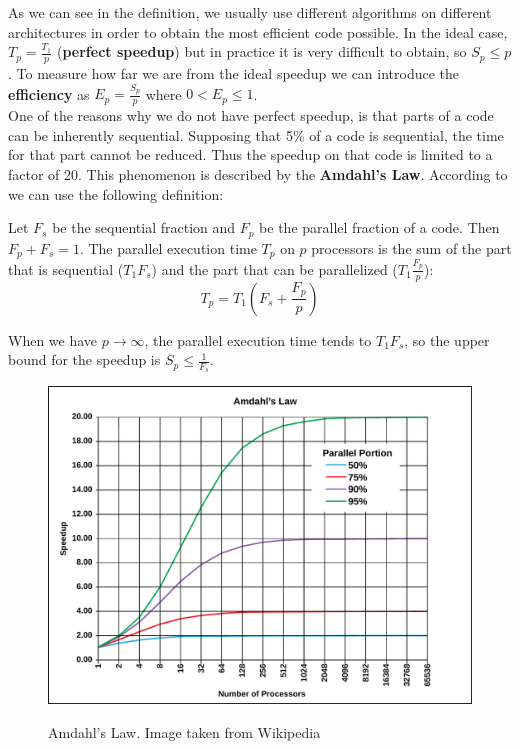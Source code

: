 As we can see in the definition, we usually use different algorithms on different architectures in order to obtain the most efficient code possible. In the ideal case, $T_{p} = \displaystyle\frac{T_{1}}{p}$ (\textbf{perfect speedup}) but in practice it is very difficult to obtain, so $S_{p} \leq p$. To measure how far we are from the ideal speedup we can introduce the \textbf{efficiency} as $E_{p} = \displaystyle\frac{S_{p}}{p}$ where $0 < E_{p} \leq 1$.\\

One of the reasons why we do not have perfect speedup, is that parts of a code can be inherently sequential. Supposing that 5\% of a code is sequential, the time for that part cannot be reduced. Thus the speedup on that code is limited to a factor of 20. This phenomenon is described by the \textbf{Amdahl's Law}. According to \cite{Eijkhout} we can use the following definition:

\begin{definition}
 Let $F_{s}$ be the sequential fraction and $F_{p}$ be the parallel fraction of a code. Then $F_{p} + F_{s} = 1$. The parallel execution time $T_{p}$ on $p$ processors is the sum of the part that is sequential ($T_{1}F_{s}$) and the part that can be parallelized ($T_{1}\displaystyle\frac{F_{p}}{p}$):
 \begin{equation}
  T_{p} = T_{1}(F_{s} + \displaystyle\frac{F_{p}}{p})
 \end{equation}
\end{definition}

When we have $p \rightarrow \infty$, the parallel execution time tends to $T_{1}F_{s}$, so the upper bound for the speedup is $S_{p} \leq \displaystyle\frac{1}{F_{s}}$.

\begin{figure}[htb] %
   \centering
   \includegraphics[width=0.70\linewidth]{images/AmdahlsLaw.pdf}\\
   \caption[Amdahl's Law]{Amdahl's Law. Image taken from Wikipedia}
   \label{fig:AmdahlsLaw}
\end{figure}

